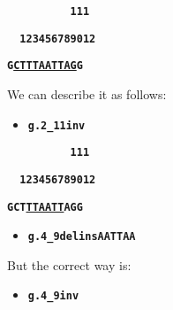 \documentclass[a4, portrait]{seminar}
\newcommand{\bt}[1]{\texttt{\textbf{#1}}}
\begin{document}
\begin{slide}
  
  \inversionexampleheader
  \begin{center}
    \bt{\,\ \ \ \ \ \ \ \ \ 111}
    \vspace{-0.3cm}

    \bt{\,\,123456789012}
    \vspace{-0.3cm}

    \bt{G\underline{CTTTAATTAG}G}
  \end{center}

  We can describe it as follows:
  \begin{itemize}
    \item \bt{g.2\_11inv}
  \end{itemize}
  \begin{center}
    \bt{\,\ \ \ \ \ \ \ \ \ 111}
    \vspace{-0.3cm}

    \bt{\,\,123456789012}
    \vspace{-0.3cm}

    \bt{GCT\underline{TTAATT}AGG}
  \end{center}
  \begin{itemize}
    \item \bt{g.4\_9delins\yellow AATTAA\white}
  \end{itemize}

  But the correct way is:
  \begin{itemize}
    \item \bt{g.4\_9inv}
  \end{itemize}
  \vfill
\end{slide}
\end{document}
